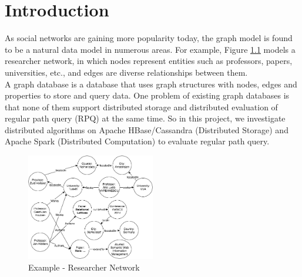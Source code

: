
\chapter{\label{cha:intro}Introduction}

As social networks are gaining more popularity today, the graph model is found to be a natural data model in numerous areas. For example, Figure \ref{fig:new-example} models a researcher network, in which nodes represent entities such as professors, papers, universities, etc., and edges are diverse relationships between them.
\\A graph database is a database that uses graph structures with nodes, edges and properties to store and query data. One problem of existing graph databases is that none of them support distributed storage and distributed evaluation of regular path query (RPQ) at the same time. So in this project, we investigate distributed algorithms on Apache HBase/Cassandra (Distributed Storage) and Apache Spark (Distributed Computation) to evaluate regular path query.

\begin{figure}[h!]
  \caption{Example - Researcher Network}
  \label{fig:new-example}
  \centering
    \includegraphics[width=0.5\textwidth]{img/new-example}
\end{figure}

